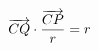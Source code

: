 \documentclass[preview]{standalone}
\begin{document}
\begin{align*}
\special{dvisvgm:raw <g id='unique000'>}\overrightarrow{CQ}\cdot\frac{\overrightarrow{CP}}{r}=r\special{dvisvgm:raw </g>}
\end{align*}
\end{document}

